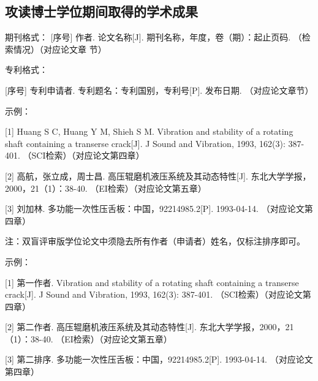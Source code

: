 \subsection{攻读博士学位期间取得的学术成果}

期刊格式：
[序号] 作者. 论文名称[J]. 期刊名称，年度，卷（期）：起止页码. （检索情况）（对应论文章
节）

专利格式：

[序号] 专利申请者. 专利题名：专利国别，专利号[P]. 发布日期. （对应论文章节）

示例：

[1] Huang S C, Huang Y M, Shieh S M. Vibration and stability of a rotating shaft containing a transerse crack[J]. J Sound and Vibration, 1993, 162(3): 387-401. （SCI检索）（对应论文第四章）

[2] 高航，张立成，周士昌. 高压辊磨机液压系统及其动态特性[J]. 东北大学学报，2000，21（1）：38-40. （EI检索）（对应论文第五章）

[3] 刘加林. 多功能一次性压舌板：中国，92214985.2[P]. 1993-04-14. （对应论文第四章）


注：双盲评审版学位论文中须隐去所有作者（申请者）姓名，仅标注排序即可。

示例：

[1] 第一作者. Vibration and stability of a rotating shaft containing a transerse crack[J]. J Sound and Vibration, 1993, 162(3): 387-401. （SCI检索）（对应论文第四章）

[2] 第二作者. 高压辊磨机液压系统及其动态特性[J]. 东北大学学报，2000，21（1）：38-40. （EI检索）（对应论文第五章）

[3] 第二排序. 多功能一次性压舌板：中国，92214985.2[P]. 1993-04-14. （对应论文第四章）



